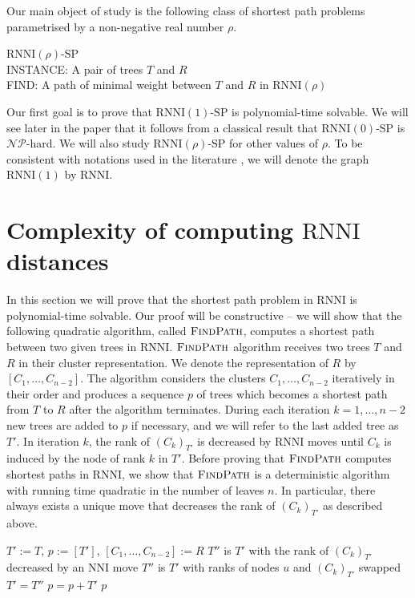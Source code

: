 \documentclass[11pt]{amsart}
\newcommand{\rnni}{\mathrm{RNNI}}
\newcommand{\findpath}{\textsc{FindPath}}
\newcommand{\rank}{\mathrm{rank}}
\newcommand{\nni}{\mathrm{NNI}}
\newcommand{\np}{\mathcal{NP}}
\newcommand{\decprob}[1]{\rnni(#1)\text{-}\mathrm{SP}}
\newcommand{\summary}[1]{} %
\begin{document}
Our main object of study is the following class of shortest path problems parametrised by a non-negative real number $\rho$.

\medskip

\noindent $\decprob{\rho}$
\medskip\\
INSTANCE: A pair of trees $T$ and $R$\\
FIND: A path of minimal weight between $T$ and $R$ in $\rnni(\rho)$

\medskip

Our first goal is to prove that $\decprob{1}$ is polynomial-time solvable.
We will see later in the paper that it follows from a classical result \autocite{Dasgupta2000-xa} that $\decprob{0}$ is $\np$-hard.
We will also study $\decprob{\rho}$ for other values of $\rho$.
To be consistent with notations used in the literature \autocite{Gavryushkin2018-ol, Collienne2019-ca}, we will denote the graph $\rnni(1)$ by $\rnni$.


\section{Complexity of computing $\rnni$ distances}
\label{sec:rnni_complexity}

\summary{Introducing $\findpath$.}
In this section we will prove that the shortest path problem in $\rnni$ is polynomial-time solvable.
Our proof will be constructive -- we will show that the following quadratic algorithm, called $\findpath$, computes a shortest path between two given trees in $\rnni$.
$\findpath$ algorithm receives two trees $T$ and $R$ in their cluster representation.
We denote the representation of $R$ by $[C_1, \ldots, C_{n-2}]$.
The algorithm considers the clusters $C_1, \ldots, C_{n-2}$ iteratively in their order and produces a sequence $p$ of trees which becomes a shortest path from $T$ to $R$ after the algorithm terminates.
During each iteration $k = 1, \ldots, n-2$ new trees are added to $p$ if necessary, and we will refer to the last added tree as $T'$.
In iteration $k$, the rank of $(C_{k})_{T'}$ is decreased by $\rnni$ moves until $C_k$ is induced by the node of rank $k$ in $T'$.
Before proving that $\findpath$ computes shortest paths in $\rnni$, we show that $\findpath$ is a deterministic algorithm with running time quadratic in the number of leaves $n$.
In particular, there always exists a unique move that decreases the rank of $(C_{k})_{T'}$ as described above.

\begin{algorithm}[H]
\caption{$\findpath$($T,R$)}
\begin{algorithmic}[1]
\STATE $T' := T$, $p := [T']$, $[C_1, \ldots, C_{n-2}] := R$
\label{alg:findpath:line:for_loop}
	\WHILE {$\rank((C_k)_{T'})>k$}
	\label{alg:findpath:line:while_loop}
			\STATE $T''$ is $T'$ with the rank of $(C_k)_{T'}$ decreased by an $\nni$ move
		\ELSE
			\STATE $T''$ is $T'$ with ranks of nodes $u$ and $(C_k)_{T'}$ swapped
		\ENDIF
		\STATE $T' = T''$
		\STATE $p = p+T'$
	\ENDWHILE
\ENDFOR
\RETURN $p$
\end{algorithmic}
\end{algorithm}
\end{document}
